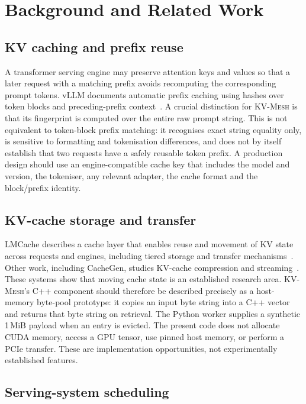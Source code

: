 \documentclass[10pt,twocolumn]{article}
\newcommand{\kvmesh}{\textsc{KV-Mesh}}
\begin{document}
\section{Background and Related Work}

\subsection{KV caching and prefix reuse}

A transformer serving engine may preserve attention keys and values so that a
later request with a matching prefix avoids recomputing the corresponding
prompt tokens. vLLM documents automatic prefix caching using hashes over token
blocks and preceding-prefix context~\cite{vllm_prefix_caching}. A crucial
distinction for \kvmesh{} is that its fingerprint is computed over the entire
raw prompt string. This is not equivalent to token-block prefix matching: it
recognises exact string equality only, is sensitive to formatting and
tokenisation differences, and does not by itself establish that two requests
have a safely reusable token prefix. A production design should use an
engine-compatible cache key that includes the model and version, the
tokeniser, any relevant adapter, the cache format and the block/prefix
identity.

\subsection{KV-cache storage and transfer}

LMCache describes a cache layer that enables reuse and movement of KV state
across requests and engines, including tiered storage and transfer
mechanisms~\cite{lmcache}. Other work, including CacheGen, studies KV-cache
compression and streaming~\cite{cachegen}. These systems show that moving
cache state is an established research area. \kvmesh{}'s C++ component should
therefore be described precisely as a host-memory byte-pool prototype: it
copies an input byte string into a C++ vector and returns that byte string on
retrieval. The Python worker supplies a synthetic 1\,MiB payload when an entry
is evicted. The present code does not allocate CUDA memory, access a GPU
tensor, use pinned host memory, or perform a PCIe transfer. These are
implementation opportunities, not experimentally established features.

\subsection{Serving-system scheduling}
\end{document}
